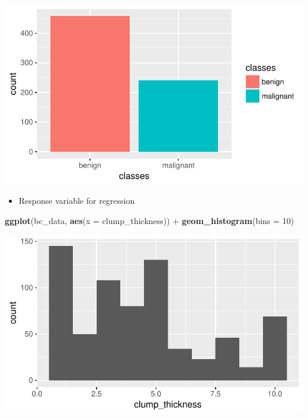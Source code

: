 \documentclass[]{article}
\newenvironment{Shaded}{\begin{snugshade}}{\end{snugshade}}
\newcommand{\KeywordTok}[1]{\textcolor[rgb]{0.13,0.29,0.53}{\textbf{{#1}}}}
\newcommand{\DataTypeTok}[1]{\textcolor[rgb]{0.13,0.29,0.53}{{#1}}}
\newcommand{\DecValTok}[1]{\textcolor[rgb]{0.00,0.00,0.81}{{#1}}}
\newcommand{\StringTok}[1]{\textcolor[rgb]{0.31,0.60,0.02}{{#1}}}
\newcommand{\NormalTok}[1]{{#1}}
\providecommand{\tightlist}{%
  \setlength{\itemsep}{0pt}\setlength{\parskip}{0pt}}
\begin{document}
\begin{center}\includegraphics{webinar_code_files/figure-latex/response_classification-1} \end{center}

\begin{itemize}
\tightlist
\item
  Response variable for regression
\end{itemize}

\begin{Shaded}
\begin{Highlighting}[]
\KeywordTok{ggplot}\NormalTok{(bc_data, }\KeywordTok{aes}\NormalTok{(}\DataTypeTok{x =} \NormalTok{clump_thickness)) +}
\StringTok{  }\KeywordTok{geom_histogram}\NormalTok{(}\DataTypeTok{bins =} \DecValTok{10}\NormalTok{)}
\end{Highlighting}
\end{Shaded}

\begin{center}\includegraphics{webinar_code_files/figure-latex/response_regression-1} \end{center}
\end{document}
